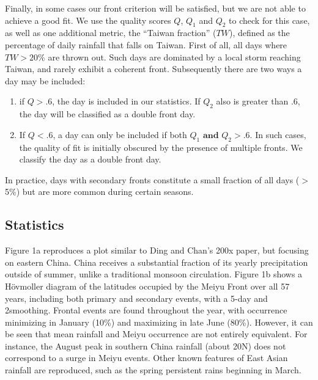\documentclass[draft,grl]{AGUTeX}
\begin{document}
\begin{article}
	Finally, in some cases our front criterion will be satisfied, but we are not able to achieve a good fit. We use the quality scores $Q$, $Q_1$ and $Q_2$ to check for this case, as well as one additional metric, the ``Taiwan fraction'' ($TW$), defined as the percentage of daily rainfall that falls on Taiwan. First of all, all days where $TW > 20\%$ are thrown out. Such days are dominated by a local storm reaching Taiwan, and rarely exhibit a coherent front. Subsequently there are two ways a day may be included: 
	
	\begin{enumerate}
		\item if $Q>.6$, the day is included in our statistics. If $Q_2$ also is greater than .6, the day will be classified as a double front day.
		
		\item If $Q<.6$, a day can only be included if both $Q_1 \mathrm{\textbf{ and }} Q_2 > .6$. In such cases, the quality of fit is initially obscured by the presence of multiple fronts. We classify the day as a double front day.
	\end{enumerate}	
		
	In practice, days with secondary fronts constitute a small fraction of all days ($>$ 5\%) but are more common during certain seasons.
	
\subsection{Statistics}	

	Figure 1a reproduces a plot similar to Ding and Chan's 200x paper, but focusing on eastern China. China receives a substantial fraction of its yearly precipitation outside of summer, unlike a traditional monsoon circulation. Figure 1b shows a H\"ovmoller diagram of the latitudes occupied by the Meiyu Front over all 57 years, including both primary and secondary events, with a 5-day and 2\textdegree smoothing. Frontal events are found throughout the year, with occurrence minimizing in January (10\%) and maximizing in late June (80\%). However, it can be seen that mean rainfall and Meiyu occurrence are not entirely equivalent. For instance, the August peak in southern China rainfall (about 20\textdegree N) does not correspond to a surge in Meiyu events. Other known features of East Asian rainfall are reproduced, such as the spring persistent rains beginning in March.
	

\end{article}
\end{document}
